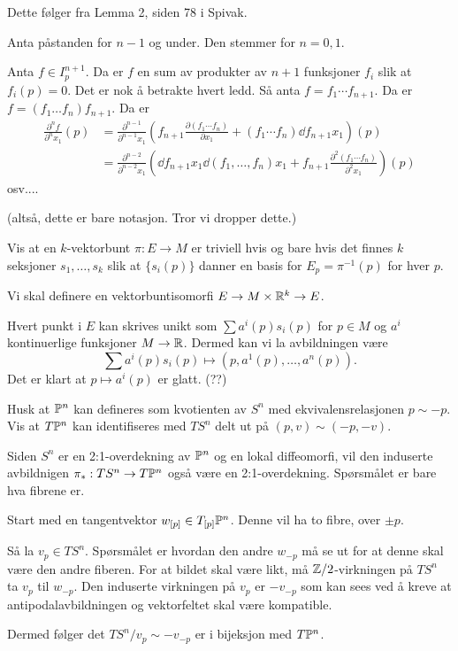 \documentclass[11pt, english]{article}
\begin{document}
\begin{sol}
Dette følger fra Lemma 2, siden 78 i Spivak.

Anta påstanden for $n-1$ og under. Den stemmer for $n=0,1$.

Anta $f \in I_p^{n+1}$. Da er $f$ en sum av produkter av $n+1$ funksjoner $f_i$ slik at $f_i(p)=0$.  Det er nok å betrakte hvert ledd. Så anta $f=f_1\cdots f_{n+1}$. Da er $f=(f_1\ldots f_n)f_{n+1}$. Da er
\begin{align*}
\frac{\partial^n f }{\partial^n x_1} (p) &= \frac{\partial^{n-1}}{\partial^{n-1}x_1} \left( f_{n+1} \frac{\partial (f_1 \cdots f_n)}{\partial x_1} + (f_1 \cdots f_n) \dd{ f_{n+1}}{x_1} \right)(p) \\
&= \frac{\partial^{n-2}}{\partial^{n-2} x_1}  \left( \dd{f_{n+1}}{x_1} \dd{(f_1, \ldots, f_n)}{x_1}  + f_{n+1} \frac{\partial^2 (f_1\cdots f_n)}{\partial^2 x_1}  \right)(p)
\end{align*}
osv....

(altså, dette er bare notasjon. Tror vi dropper dette.)

\end{sol}

\begin{exc}
Vis at en $k$-vektorbunt $\pi:E \to M$ er triviell hvis og bare hvis det finnes $k$ seksjoner $s_1,\ldots, s_k$ slik at $\{ s_i(p)\}$ danner en basis for $E_p=\pi^{-1}(p)$ for hver $p$.
\end{exc}
\begin{sol}
Vi skal definere en vektorbuntisomorfi $E \to M \times \mathbb{R}^k \to E$.

Hvert punkt i $E$ kan skrives unikt som $\sum a^i(p) s_i(p)$ for $p \in M$ og $a^i$ kontinuerlige funksjoner $M \to \mathbb{R}$. Dermed kan vi la avbildningen være
$$
\sum a^i(p) s_i(p) \mapsto (p, a^1(p), \ldots, a^n(p)).
$$
Det er klart at $p \mapsto a^i(p)$ er glatt. (??)
\end{sol}

\begin{exc}
Husk at $\mathbb{P}^n$ kan defineres som kvotienten av $S^n$ med ekvivalensrelasjonen $p \sim -p$. Vis at $T \mathbb{P}^n$ kan identifiseres med $TS^n$ delt ut på $(p,v) \sim (-p,-v)$. 
\end{exc}
\begin{sol}
Siden $S^n$ er en 2:1-overdekning av $\mathbb{P}^n$ og en lokal diffeomorfi, vil den induserte avbildnigen $\pi_\ast: TS^n \to T \mathbb{P}^n$ også være en 2:1-overdekning. Spørsmålet er bare hva fibrene er.

Start med en tangentvektor $w_{[p]} \in T_{[p]} \mathbb{P}^n$. Denne vil ha to fibre, over $\pm p$.

Så la $v_p \in TS^n$. Spørsmålet er hvordan den andre $w_{-p}$ må se ut for at denne skal være den andre fiberen. For at bildet skal være likt, må $\mathbb{Z}/2$-virkningen på $TS^n$ ta $v_p$ til $w_{-p}$. Den induserte virkningen på $v_p$ er $-v_{-p}$ som kan sees ved å kreve at antipodalavbildningen og vektorfeltet skal være kompatible. 

Dermed følger det $TS^n / v_p \sim -v_{-p}$ er i bijeksjon med $T \mathbb{P}^n$.
\end{sol}
\end{document}
